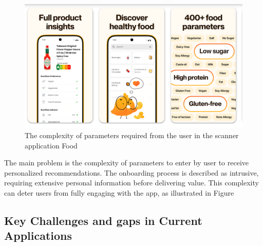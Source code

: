 \begin{figure}[H]
\centering
\includegraphics[scale=0.45]{images/food_check.png}
\caption{The complexity of parameters required from the user in the scanner application Food}
\label{fig:foofCheck}
\end{figure}

The main problem is the complexity of parameters to enter by user
to receive personalized recommendations. The onboarding process is
described as intrusive, requiring extensive personal information before
delivering value. This complexity can deter users from fully engaging
with the app, as illustrated in Figure

\subsection{Key Challenges and gaps in Current Applications}

